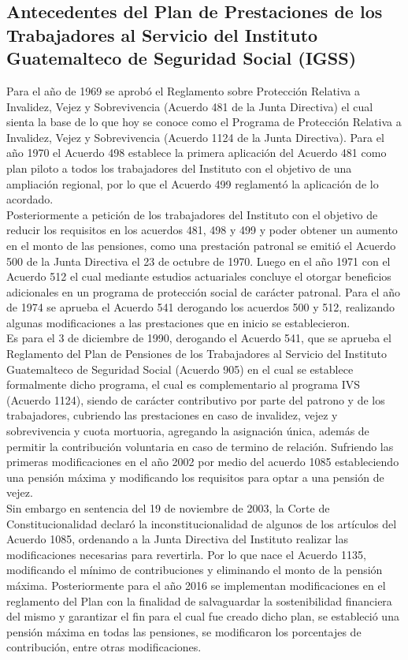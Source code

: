 \documentclass[12pt,letterpaper,titlepage]{article}
\begin{document}
{\subsection{Antecedentes del Plan de Prestaciones de los Trabajadores al Servicio del Instituto Guatemalteco de Seguridad Social (IGSS)}

Para el año de 1969 se aprobó el Reglamento sobre Protección Relativa a Invalidez, Vejez y Sobrevivencia (Acuerdo 481 de la Junta Directiva) el cual sienta la base de lo que hoy se conoce como el Programa de Protección Relativa a Invalidez, Vejez y Sobrevivencia (Acuerdo 1124 de la Junta Directiva). Para el año 1970 el Acuerdo 498 establece la primera aplicación del Acuerdo 481 como plan piloto a todos los trabajadores del Instituto  con el objetivo de una ampliación regional, por lo que el Acuerdo 499 reglamentó la aplicación de lo acordado.\\

Posteriormente a petición de los trabajadores del Instituto con el objetivo de reducir los requisitos en los acuerdos 481, 498 y 499 y poder obtener un aumento en el monto de las pensiones, como una prestación patronal se emitió el Acuerdo 500 de la Junta Directiva el 23 de octubre de 1970. Luego en el año 1971 con el Acuerdo 512 el cual mediante estudios actuariales concluye el otorgar beneficios adicionales en un programa de protección social de carácter patronal. Para el año de 1974 se aprueba el Acuerdo 541 derogando los acuerdos 500 y 512, realizando algunas modificaciones a las prestaciones que en inicio se establecieron.\\


Es para el 3 de diciembre de 1990, derogando el Acuerdo 541, que se aprueba el Reglamento del Plan de Pensiones de los Trabajadores al Servicio del Instituto Guatemalteco de Seguridad Social (Acuerdo 905) en el cual se establece formalmente dicho programa, el cual es complementario al programa IVS (Acuerdo 1124), siendo de carácter contributivo por parte del patrono y de los trabajadores, cubriendo las prestaciones en caso de invalidez, vejez y sobrevivencia y cuota mortuoria, agregando la asignación única, además de permitir la contribución voluntaria en caso de termino de relación. Sufriendo las primeras modificaciones en el año 2002 por medio del acuerdo 1085 estableciendo una pensión máxima y modificando los requisitos para optar a una pensión de vejez.\\


Sin embargo en sentencia del 19 de noviembre de 2003, la Corte de Constitucionalidad declaró la inconstitucionalidad de algunos de los artículos del Acuerdo 1085, ordenando a la Junta Directiva del Instituto realizar las modificaciones necesarias para revertirla. Por lo que nace el Acuerdo 1135, modificando el mínimo de contribuciones y eliminando el monto de la pensión máxima. Posteriormente para el año 2016 se implementan modificaciones en el reglamento del Plan con la finalidad de salvaguardar la sostenibilidad financiera del mismo y garantizar el fin para el cual fue creado dicho plan, se estableció una pensión máxima en todas las pensiones, se modificaron los porcentajes de contribución, entre otras modificaciones.



}
\end{document}
